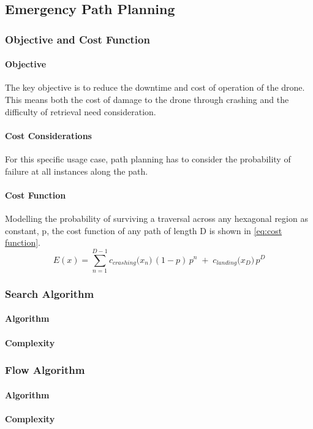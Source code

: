 \subsection{Emergency Path Planning}

\subsubsection{Objective and Cost Function}
\paragraph{Objective}
The key objective is to reduce the downtime and cost of operation of the drone. This means both the cost of damage to the drone through crashing and the difficulty of retrieval need consideration.
\paragraph{Cost Considerations}
For this specific usage case, path planning has to consider the probability of failure at all instances along the path. 
\paragraph{Cost Function}
Modelling the probability of surviving a traversal across any hexagonal region as constant, p, the cost function of any path of length D is shown in \ref{eq:cost function}.
\begin{equation}\label{eq:cost function}
    E(x) 
    = \sum_{n=1}^{D-1} c_{crashing}\bigl(x_n\bigr)\, (1-p) \,p^n 
    \;+\; c_{landing}\bigl(x_D\bigr)\, p^D
\end{equation}


\subsubsection{Search Algorithm}
\paragraph{Algorithm}

\paragraph{Complexity}

\subsubsection{Flow Algorithm}
\paragraph{Algorithm}

\paragraph{Complexity}
